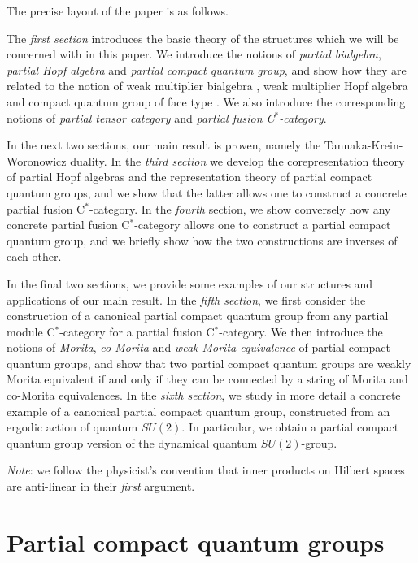 \documentclass[10pt]{article}
\theoremstyle{definition}
\numberwithin{equation}{section}
\begin{document}
The precise layout of the paper is as follows.

The \emph{first section} introduces the basic theory of the structures which we will be concerned with in this paper. We introduce the notions of \emph{partial bialgebra}, \emph{partial Hopf algebra} and \emph{partial compact quantum group}, and show how they are related to the notion of weak multiplier bialgebra \cite{Boh1}, weak multiplier Hopf algebra \cite{VDW1,VDW2} and compact quantum group of face type \cite{Hay1}. We also introduce the corresponding notions of \emph{partial tensor category} and \emph{partial fusion C$^*$-category}. 

In the next two sections, our main result is proven, namely the Tannaka-Krein-Woronowicz duality. In the \emph{third section} we develop the corepresentation theory of partial Hopf algebras and the representation theory of partial compact quantum groups, and we show that the latter allows one to construct a concrete partial fusion C$^*$-category. In the \emph{fourth} section, we show conversely how any concrete partial fusion C$^*$-category allows one to construct a partial compact quantum group, and we briefly show how the two constructions are inverses of each other.

In the final two sections, we provide some examples of our structures and applications of our main result. In the \emph{fifth section}, we first consider the construction of a canonical partial compact quantum group from any partial module C$^*$-category for a partial fusion C$^*$-category. We then introduce the notions of \emph{Morita}, \emph{co-Morita} and \emph{weak Morita equivalence} \cite{Mug1} of partial compact quantum groups, and show that two partial compact quantum groups are weakly Morita equivalent if and only if they can be connected by a string of Morita and co-Morita equivalences. In the \emph{sixth section}, we study in more detail a concrete example of a canonical partial compact quantum group, constructed from an ergodic action of quantum $SU(2)$. In particular, we obtain a partial compact quantum group version of the dynamical quantum $SU(2)$-group. 

\emph{Note}: we follow the physicist's convention that inner products on Hilbert spaces are anti-linear in their \emph{first} argument. 


\section{Partial compact quantum groups}
\end{document}
